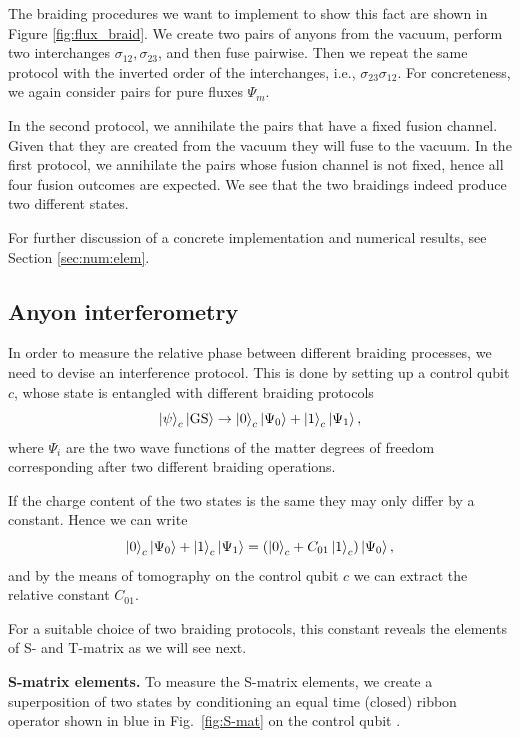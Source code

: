 \documentclass[two column]{article}
\begin{document}
The braiding procedures we want to implement to show this fact are shown in Figure \ref{fig:flux_braid}. We create two pairs of anyons from the vacuum, perform two interchanges $\sigma_{12}, \sigma_{23}$, and then fuse pairwise. Then we repeat the same protocol with the inverted order of the interchanges, i.e., $\sigma_{23} \sigma_{12}$. For concreteness, we again consider pairs for pure fluxes $\Psi_m$. 



In the second protocol, we annihilate the pairs that have a fixed fusion channel. Given that they are created from the vacuum they will fuse to the vacuum.
In the first protocol, we annihilate the pairs whose fusion channel is not fixed, hence all four fusion outcomes are expected. We see that the two braidings indeed produce two different states. 

For further discussion of a concrete implementation and numerical results, see Section \ref{sec:num:elem}.

\subsection{Anyon interferometry}\label{subsec:Intef}




In order to measure the relative phase between different braiding processes, we need to devise an interference protocol. This is done by setting up a control qubit $c$, whose state is entangled with different braiding protocols
\begin{equation}
    \ket{\psi}_c\ket{\text{GS}} \rightarrow \ket{0}_c \ket{\Psi_0} + \ket{1}_c \ket{\Psi_1},
\end{equation}
where $\Psi_i$ are the two wave functions of the matter degrees of freedom corresponding after two different braiding operations.

If the charge content of the two states is the same they may only differ by a constant. Hence we can write
\begin{equation}
    \ket{0}_c \ket{\Psi_0} + \ket{1}_c \ket{\Psi_1} = (\ket{0}_c + C_{01}\ket{1}_c)\ket{\Psi_0},
\end{equation}
and by the means of tomography on the control qubit $c$ we can extract the relative constant $C_{01}$.

For a suitable choice of two braiding protocols, this constant reveals the elements of S- and T-matrix as we will see next.

\textbf{S-matrix elements.}
To measure the S-matrix elements, we create a superposition of two states by conditioning an equal time (closed) ribbon operator shown in blue in Fig.~\ref{fig:S-mat} on the control qubit . 
\end{document}
